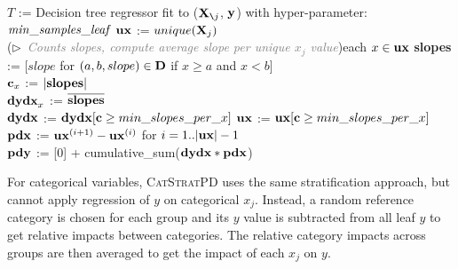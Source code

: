 \documentclass{article}
\newcommand{\cspd}{\fontfamily{cmr}\textsc{\small CatStratPD}}
\newcommand{\xnj}{${\bf X}_{\texttt{\char`\\}j}$}
\begin{document}
\SetAlgoNoEnd%
\setlength{\algomargin}{5pt}
\begin{algorithm}[H]
\SetAlgoLined
\DontPrintSemicolon
{}
\SetAlgoSkip{}
$T$ := Decision tree regressor fit to (\xnj{}, $\bf y$) with hyper-parameter: ${\it min\_samples\_leaf}$\;
$\bf ux$ := $unique({\bf X}_j)$\\
\For(\hfill$\triangleright$\ {\it\textcolor{gray}{\small Counts slopes, compute average slope per unique $x_j$ value}}){each $x \in {\bf ux}$}{
	{\bf slopes} := [$slope$ for $(a,b,slope) \in \bf D$ if $x \ge a$ and $x <b$]\\
	${\bf c}_x$ := $|{\bf slopes}|$\\
	${\bf dydx}_x$ := $\overline{\bf slopes}$\\
}
${\bf dydx}$ := ${\bf dydx}[{\bf c} \ge min\_slopes\_per\_x]$
${\bf ux}$ := ${\bf ux}[{\bf c} \ge min\_slopes\_per\_x]$\\
$\bf pdx$ := ${\bf ux}^{(i+1)} - {\bf ux}^{(i)}$ for $i = 1..|{\bf ux}|-1$\\
$\bf pdy$ := [0] + cumulative\_sum(${\bf dydx} * \bf pdx$)~~~
\label{alg:CatStratPD}
\end{algorithm}

For categorical variables, \cspd{} uses the same stratification approach, but cannot apply  regression of $y$ on categorical $x_j$. Instead, a random reference category is chosen for each group and its $y$ value is subtracted from all leaf $y$ to get relative impacts between categories. The relative category impacts across groups are then averaged to get the impact of each $x_j$ on $y$.
\end{document}

